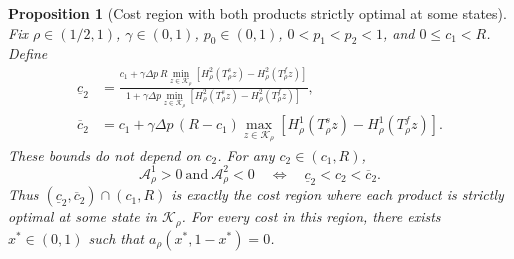 \documentclass[11pt]{article}
\newtheorem{proposition}{Proposition}
\begin{document}
\begin{proposition}[Cost region with both products strictly optimal at some states]
\label{prop:cost-region}
Fix $\rho\in(1/2,1)$, $\gamma\in(0,1)$, $p_0\in(0,1)$,
$0<p_1<p_2<1$, and $0\leq c_1<R$. Define
\begin{align*}
\underline c_2
&=\frac{
 c_1+\gamma\Delta p\,R
 \displaystyle\min_{z\in\mathcal K_\rho}
 \left[H_\rho^2(T_\rho^s z)-H_\rho^2(T_\rho^f z)\right]
}{
 1+\gamma\Delta p
 \displaystyle\min_{z\in\mathcal K_\rho}
 \left[H_\rho^2(T_\rho^s z)-H_\rho^2(T_\rho^f z)\right]
},\\[1ex]
\overline c_2
&=c_1+\gamma\Delta p\,(R-c_1)
\max_{z\in\mathcal K_\rho}
\left[H_\rho^1(T_\rho^s z)-H_\rho^1(T_\rho^f z)\right].
\end{align*}
These bounds do not depend on $c_2$. For any $c_2\in(c_1,R)$,
\begin{equation}
\mathcal A_\rho^1>0\ \text{and}\ \mathcal A_\rho^2<0
\quad\Longleftrightarrow\quad
\underline c_2<c_2<\overline c_2.
\end{equation}
Thus $(\underline c_2,\overline c_2)\cap(c_1,R)$ is exactly the cost
region where each product is strictly optimal at some state in
$\mathcal K_\rho$. For every cost in this region, there exists
$x^*\in(0,1)$ such that $a_\rho(x^*,1-x^*)=0$.
\end{proposition}
\end{document}
